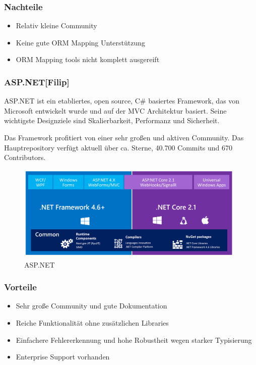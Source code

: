 \subsubsection*{Nachteile}
\begin{itemize}
    \item Relativ kleine Community
    \item Keine gute ORM Mapping Unterstützung
    \item ORM Mapping tools nicht komplett ausgereift
\end{itemize}

\subsubsection*{ASP.NET\hfill[Filip]}
ASP.NET ist ein etabliertes, open source, C\# basiertes Framework, das von Microsoft entwickelt wurde und auf der MVC Architektur basiert. Seine wichtigste Designziele sind Skalierbarkeit, Performanz und Sicherheit.

Das Framework profitiert von einer sehr großen und aktiven Community. Das Hauptrepository verfügt aktuell über ca.  Sterne, 40.700 Commits und 670 Contributors.

\begin{figure}[!h]
\centering
\includegraphics[width=11cm]{images/0x_technology_stack/asp_net.png}
\caption{ASP.NET}
\end{figure}
\subsubsection*{Vorteile}
\begin{itemize}
    \item Sehr große Community und gute Dokumentation
    \item Reiche Funktionalität ohne zusätzlichen Libraries
    \item Einfachere Fehlererkennung und hohe Robustheit wegen starker Typisierung
    \item Enterprise Support vorhanden
\end{itemize}

